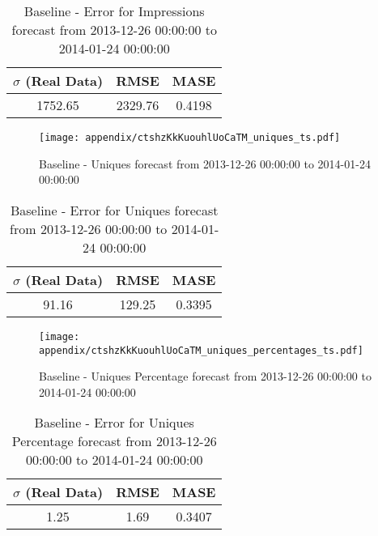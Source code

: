\begin{table}[H]
\centering
\footnotesize
\begin{tabular}{ccc}
$\sigma$ (Real Data) & RMSE & MASE   \\ \hline
1752.65 & 2329.76 & 0.4198 \\
\end{tabular}

\vspace{0.5cm}

\caption[]{
Baseline - Error for Impressions forecast from 2013-12-26 00:00:00 to 2014-01-24 00:00:00}
\end{table}

\begin{figure}[H] \begin{center} \leavevmode
\texttt{[image: appendix/ctshzKkKuouhlUoCaTM\_uniques\_ts.pdf]} \caption[]{
Baseline - Uniques forecast from 2013-12-26 00:00:00 to 2014-01-24 00:00:00} \label{fig:appendix/ctshzKkKuouhlUoCaTM_uniques_ts.pdf} \end{center}
\end{figure}

\begin{table}[H]
\centering
\footnotesize
\begin{tabular}{ccc}
$\sigma$ (Real Data) & RMSE & MASE   \\ \hline
91.16 & 129.25 & 0.3395 \\
\end{tabular}

\vspace{0.5cm}

\caption[]{
Baseline - Error for Uniques forecast from 2013-12-26 00:00:00 to 2014-01-24 00:00:00}
\end{table}

\begin{figure}[H] \begin{center} \leavevmode
\texttt{[image: appendix/ctshzKkKuouhlUoCaTM\_uniques\_percentages\_ts.pdf]} \caption[]{
Baseline - Uniques Percentage forecast from 2013-12-26 00:00:00 to 2014-01-24 00:00:00} \label{fig:appendix/ctshzKkKuouhlUoCaTM_uniques_percentages_ts.pdf} \end{center}
\end{figure}

\begin{table}[H]
\centering
\footnotesize
\begin{tabular}{ccc}
$\sigma$ (Real Data) & RMSE & MASE   \\ \hline
1.25 & 1.69 & 0.3407 \\
\end{tabular}

\vspace{0.5cm}

\caption[]{
Baseline - Error for Uniques Percentage forecast from 2013-12-26 00:00:00 to 2014-01-24 00:00:00}
\end{table}

